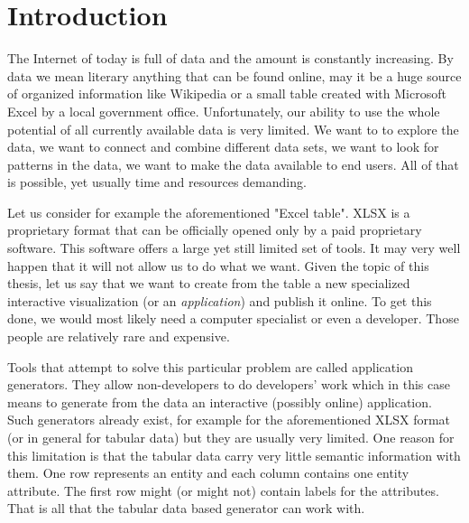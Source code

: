 \chapter*{Introduction}

The Internet of today is full of data and the amount is constantly increasing. By data we mean literary anything that can be found online, may it be a huge source of organized information like Wikipedia or a small table created with Microsoft Excel by a local government office. Unfortunately, our ability to use the whole potential of all currently available data is very limited. We want to to explore the data, we want to connect and combine different data sets, we want to look for patterns in the data, we want to make the data available to end users. All of that is possible, yet usually time and resources demanding. 

Let us consider for example the aforementioned "Excel table".  XLSX is a proprietary format that can be officially opened only by a paid proprietary software. This software offers a large yet still limited set of tools. It may very well happen that it will not allow us to do what we want. Given the topic of this thesis, let us say that we want to create from the table a new specialized interactive visualization (or an \textit{application}) and publish it online. To get this done,  we would most likely need a computer specialist or  even a developer. Those people are relatively rare and expensive.

Tools that attempt to solve this particular problem are called application generators. They allow non-developers to do developers' work which in this case means to generate from the data an interactive (possibly online) application. Such generators already exist, for example for the aforementioned XLSX format (or in general for tabular data) but they are usually very limited. One reason for this limitation is that the tabular data carry very little semantic information with them. One row represents an entity and each column contains one entity attribute. The first row might (or might not) contain labels for the attributes. That is all that the tabular data based generator can work with.

